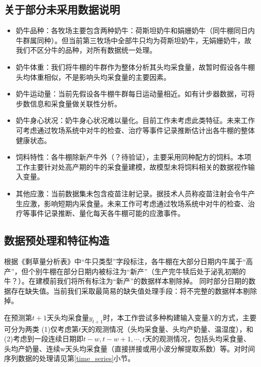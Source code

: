 \subsection{关于部分未采用数据说明} 
\begin{itemize}
\item 奶牛品种：各牧场主要包含两种奶牛：荷斯坦奶牛和娟姗奶牛（同牛棚同日内牛群属同种）。但当前第三牧场中全部牛只均为荷斯坦奶牛，无娟姗奶牛，故我们不区分牛的品种，对所有数据统一处理。

\item 奶牛体重：我们将牛棚的牛群作为整体分析其头均采食量，故暂时假设各牛棚头均体重相似，不是影响头均采食量的主要因素。

\item 奶牛运动量：当前先假设各牛棚牛群每日运动量相近。如有计步器数据，可将步数信息和采食量做关联性分析。

\item 奶牛身心状况：奶牛身心状况难以量化。目前工作未考虑此类特征。未来工作可考虑通过牧场系统中对牛的检查、治疗等事件记录推断估计出各牛棚的整体健康状态。

\item 饲料特性：各牛棚除新产牛外（？待验证），主要采用同种配方的饲料。本项工作主要针对处高产期的牛的采食量建模，故模型未将饲料相关的数据视作输入变量。

\item 其他应激：当前数据集未包含疫苗注射记录。据技术人员称疫苗注射会令牛产生应激，影响短期内采食量。未来工作可考虑通过牧场系统中对牛的检查、治疗等事件记录推断、量化每天各牛棚可能的应激事件。
\end{itemize}


\subsection{数据预处理和特征构造}

根据《剩草量分析表》中“牛只类型”字段标注，各牛棚在大部分日期内牛属于“高产”，但个别牛棚在部分日期内被标注为“新产”（生产完牛犊后处于泌乳初期的牛？）。在建模前我们将所有标注为“新产”的数据样本剔除掉。
同时部分日期的数据存在缺失值。当前我们采取最简易的缺失值处理手段：将不完整的数据样本剔除掉。


在预测第$t+1$天头均采食量$y_{t+1}$时，本工作尝试多种构建输入变量$X$的方式，主要可分为两类
(1)仅考虑第$t$天的观测情况（头均采食量、头均产奶量、温湿度），和(2)考虑到一段连续日期即$t-w, t-w+1, \cdots, t$天的观测情况，包括头均采食量、头均产奶量、连续w天头均采食量（直接拼接或用小波分解提取系数）等。对时间序列数据的处理请见第\ref{time_series}小节。

